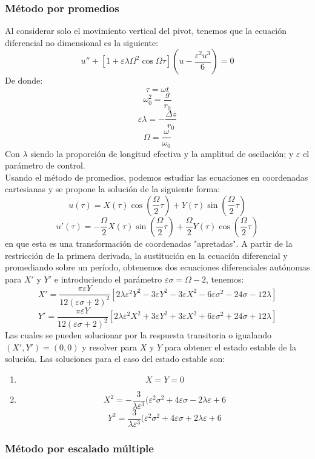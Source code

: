\documentclass{article}
\begin{document}
\subsubsection{Método por promedios}


Al considerar solo el movimiento vertical del pivot, tenemos que la ecuación diferencial no dimensional es la siguiente:
$$u''+[1+\varepsilon\lambda\Omega^2\cos{\Omega\tau}]\left(u-\frac{\varepsilon^2u^3}{6}\right)=0$$
De donde: $$\tau=\omega t$$ $$\omega_0^2=\frac{g}{r_0}$$ $$\varepsilon\lambda=-\frac{\Delta z}{r_0}$$ $$\Omega=\frac{\omega}{\omega_0}$$
Con $\lambda$ siendo la proporción de longitud efectiva y la amplitud de oscilación; y $\varepsilon$ el parámetro de control.\\

Usando el método de promedios, podemos estudiar las ecuaciones en coordenadas cartesianas y se propone la solución de la siguiente forma: $$u(\tau)=X(\tau)\cos\left(\frac{\Omega}{2}\tau\right)+Y(\tau)\sin\left(\frac{\Omega}{2}\tau\right)$$
$$u'(\tau)=-\frac{\Omega}{2}X(\tau)\sin\left(\frac{\Omega}{2}\tau\right)+\frac{\Omega}{2}Y(\tau)\cos\left(\frac{\Omega}{2}\tau\right)$$
en que esta es una transformación de coordenadas "apretadas". A partir de la restricción de la primera derivada, la sustitución en la ecuación diferencial y promediando sobre un período, obtenemos dos ecuaciones diferenciales autónomas para $X'$ y $Y'$ e introduciendo el parámetro $\varepsilon\sigma=\Omega-2$, tenemos: $$X'=\frac{\pi\varepsilon Y}{12(\varepsilon\sigma+2)^2}[2\lambda\varepsilon^2Y^2-3\varepsilon Y^2-3\varepsilon X^2-6\varepsilon\sigma^2-24\sigma-12\lambda]$$ 
$$Y'=\frac{\pi\varepsilon Y}{12(\varepsilon\sigma+2)^2}[2\lambda\varepsilon^2X^2+3\varepsilon Y^2+3\varepsilon X^2+6\varepsilon\sigma^2+24\sigma+12\lambda]$$
Las cuales se pueden solucionar por la respuesta transitoria o igualando $(X',Y')=(0,0)$ y resolver para $X$ y $Y$ para obtener el estado estable de la solución. Las soluciones para el caso del estado estable son:\begin{enumerate}
    \item $$X=Y=0$$
    \item $$X^2=-\frac{3}{\lambda\varepsilon^3}(\varepsilon^2\sigma^2+4\varepsilon\sigma-2\lambda\varepsilon+6$$ $$Y^2=\frac{3}{\lambda\varepsilon^3}(\varepsilon^2\sigma^2+4\varepsilon\sigma+2\lambda\varepsilon+6$$
\end{enumerate}
\subsubsection{Método por escalado múltiple}
\end{document}

